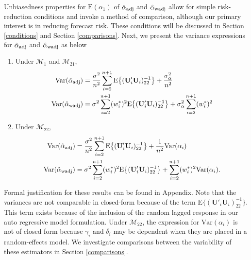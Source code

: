 \documentclass[11pt]{article}
\def\mbf#1{\mathbf{#1}} %
\def\mrm#1{\mathrm{#1}} %
\def\mc#1{\mathcal{#1}} %
\def\E#1{\mathrm{E}(#1)} %
\def\var#1{\mathrm{Var}(#1)} %
\theoremstyle{definition}
\begin{document}
Unbiasedness properties for $\E{\alpha_1}$ of $\hat{\alpha}_{\rm adj}$ and $\hat{\alpha}_{\rm wadj}$ allow for simple risk-reduction conditions and invoke a method of comparison, although our primary interest is in reducing forecast risk. %
These conditions will be discussed in Section \ref{conditions} and Section \ref{comparisons}. Next, we present the variance expressions for $\hat{\alpha}_{\rm adj}$ and $\hat{\alpha}_{\rm wadj}$ as below

\begin{enumerate}[label = (\roman*)]
  \item Under $\mc{M}_1$ and $\mc{M}_{21}$,  
\begin{align*}
  \var{\hat{\alpha}_{\rm adj}} 
  &=\frac{\sigma^2}{n^2}\sum_{i=2}^{n+1}\mrm{E}\big\{(\mbf{U}'_i\mbf{U}_i)^{-1}_{22}\big\}+\frac{\sigma^2_{\alpha}}{n^2}\\
\var{\hat{\alpha}_{\rm wadj}}  &= \sigma^2\sum_{i=2}^{n+1}(w_i^*)^2\mrm{E}\big\{(\mbf{U}'_i\mbf{U}_i)^{-1}_{22}\big\}+\sigma^2_{\alpha}\sum_{i=2}^{n+1}(w_i^*)^2
\end{align*}
\item Under $\mc{M}_{22}$, 
\begin{align*}
\var{\hat{\alpha}_{\rm adj}} 
  &=\frac{\sigma^2}{n^2}\sum_{i=2}^{n+1}\mrm{E}\big\{(\mbf{U}'_i\mbf{U}_i)^{-1}_{22}\big\}+\frac{1}{n^2}\var{\alpha_i}\\
  \var{\hat{\alpha}_{\rm wadj}} 
  &= \sigma^2\sum_{i=2}^{n+1}(w_i^*)^2\mrm{E}\big\{(\mbf{U}'_i\mbf{U}_i)^{-1}_{22}\big\}
  + \sum_{i=2}^{n+1} (w_i^*)^2 \var{\alpha_i}.
\end{align*}
\end{enumerate}
Formal justification for these results can be found in Appendix. Note that the variances are not comparable in closed-form %
because of the term $\mrm{E}\big\{(\mbf{U}'_i\mbf{U}_i)^{-1}_{22}\big\}$.  This term exists because of the inclusion of the random lagged response in our auto regressive model formulation.  Under $\mc{M}_{22}$, the expression for $\var{\alpha_i}$ is not of closed form because $\gamma_i$ and $\delta_i$ may be dependent when they are placed in a random-effects model. We investigate comparisons between the variability of these estimators in Section \ref{comparisons}.%
\end{document}
